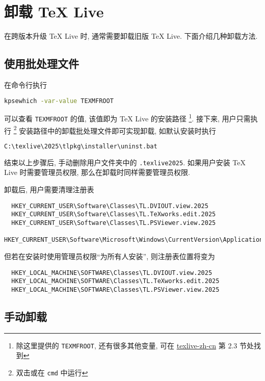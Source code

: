 \section{卸载 \TeX{} Live}

在跨版本升级 \TeX{} Live 时, 通常需要卸载旧版 \TeX{} Live.
下面介绍几种卸载方法.

\subsection{使用批处理文件}

在命令行执行
\begin{lstlisting}[language=bash]
  kpsewhich -var-value TEXMFROOT
\end{lstlisting}
可以查看 \texttt{TEXMFROOT} 的值,
该值即为 \TeX{} Live 的安装路径%
\footnote{%
  除这里提供的 \texttt{TEXMFROOT}, 还有很多其他变量, 可在
  \href{https://www.tug.org/texlive/doc/texlive-zh-cn/texlive-zh-cn.pdf}{texlive-zh-cn}
  第 2.3 节处找到
}. 
接下来,
用户只需执行%
\footnote{双击或在 \texttt{cmd} 中运行}%
安装路径中的卸载批处理文件即可实现卸载, 如默认安装时执行
\begin{lstlisting}[language=bash]
  C:\texlive\2025\tlpkg\installer\uninst.bat
\end{lstlisting}
结束以上步骤后,
手动删除用户文件夹中的 \texttt{.texlive2025}.
如果用户安装 \TeX{} Live 时需要管理员权限,
那么在卸载时同样需要管理员权限.

卸载后,
用户需要清理注册表
\begin{lstlisting}
  HKEY_CURRENT_USER\Software\Classes\TL.DVIOUT.view.2025
  HKEY_CURRENT_USER\Software\Classes\TL.TeXworks.edit.2025
  HKEY_CURRENT_USER\Software\Classes\TL.PSViewer.view.2025
  HKEY_CURRENT_USER\Software\Microsoft\Windows\CurrentVersion\ApplicationAssociationToasts\TL.TeXworks.edit.2025_.tex
\end{lstlisting}
但若在安装时使用管理员权限``为所有人安装'',
则注册表位置将变为
\begin{lstlisting}
  HKEY_LOCAL_MACHINE\SOFTWARE\Classes\TL.DVIOUT.view.2025
  HKEY_LOCAL_MACHINE\SOFTWARE\Classes\TL.TeXworks.edit.2025
  HKEY_LOCAL_MACHINE\SOFTWARE\Classes\TL.PSViewer.view.2025
\end{lstlisting}

\subsection{手动卸载}


